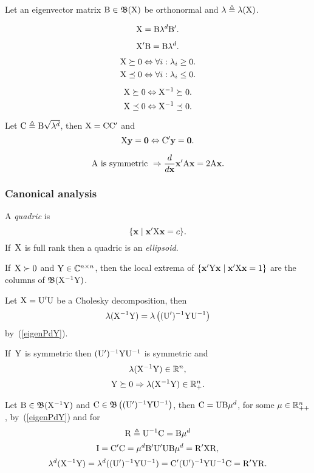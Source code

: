 \documentclass[10pt,a4paper]{article}
\theoremstyle{plain} \newtheorem{Lem}{Lemma}
\begin{document}
Let an eigenvector matrix $\mathrm B \in \mathfrak B (\mathrm X)$ be orthonormal and $\mathbf \lambda \triangleq \mathbf \lambda (\mathrm X)$.

$$  \mathrm X = \mathrm B \mathbf \lambda^d \mathrm B'. $$

$$ \mathrm X' \mathrm B = \mathrm B \mathbf \lambda^d. $$

$$ \mathrm X \succeq 0 \Leftrightarrow \forall i : \lambda_i \ge 0. $$
$$ \mathrm X \preceq 0 \Leftrightarrow \forall i : \lambda_i \le 0. $$

$$ \mathrm X \succeq 0 \Leftrightarrow \mathrm X^{-1} \succeq 0. $$
$$ \mathrm X \preceq 0 \Leftrightarrow \mathrm X^{-1} \preceq 0. $$

Let $\mathrm C \triangleq \mathrm B \sqrt{\mathbf \lambda^d}$,
then $\mathrm X = \mathrm C \mathrm C'$
and
\begin{equation*}
\mathrm X \mathbf y = \mathbf 0 \Leftrightarrow \mathrm C' \mathbf y = \mathbf 0.
\end{equation*}

$$ \mathrm A \text{ is symmetric } \Rightarrow \frac d {d \mathbf x} \mathbf x' \mathrm A \mathbf x = 2 \mathrm A \mathbf x. $$


\subsubsection{Canonical analysis}  \label{CanonicalAnalysis}
A {\em quadric} is
$$ \{\mathbf x \mid \mathbf x' \mathrm X \mathbf x = c\}. $$
If~$\mathrm X$ is full rank then a quadric is an {\em ellipsoid}.

If~$\mathrm X \succ 0$ and $\mathrm Y \in \mathbb C^{n \times n}$,
then the local extrema of $\{\mathbf x' \mathrm Y \mathbf x \mid \mathbf x' \mathrm X \mathbf x = 1\}$
are the columns of $\mathfrak B(\mathrm X^{-1} \mathrm Y)$.

Let $\mathrm X = \mathrm U' \mathrm U$ be a Cholesky decomposition,
then
$$\mathbf \lambda(\mathrm X^{-1} \mathrm Y) = \mathbf \lambda \left((\mathrm U')^{-1} \mathrm Y \mathrm U^{-1} \right)$$
by~(\ref{eigenPdY}).

\bigskip
If~$\mathrm Y$ is symmetric then $(\mathrm U')^{-1} \mathrm Y \mathrm U^{-1}$ is symmetric
and
$$\mathbf \lambda(\mathrm X^{-1} \mathrm Y) \in \mathbb R^n,$$
$$\mathrm Y \succeq 0 \Rightarrow \mathbf \lambda(\mathrm X^{-1} \mathrm Y) \in \mathbb R_+^n.$$

Let  $\mathrm B \in \mathfrak B(\mathrm X^{-1} \mathrm Y)$ and $\mathrm C \in \mathfrak B \left((\mathrm U')^{-1} \mathrm Y \mathrm U^{-1} \right)$,
then $\mathrm C = \mathrm U \mathrm B \mathbf \mu^d$, for some $\mathbf \mu \in \mathbb R_{++}^n$, by~(\ref{eigenPdY}) and
for $$ \mathrm R \triangleq \mathrm U^{-1} \mathrm C = \mathrm B \mathbf \mu^d$$
\begin{equation} \label{canonicalWithin}
  \mathrm I = \mathrm C' \mathrm C = \mathbf \mu^d \mathrm B' \mathrm U' \mathrm U \mathrm B \mathbf \mu^d = \mathrm R' \mathrm X \mathrm R,
\end{equation}
\begin{equation} \label{canonicalBetween}
 \mathbf \lambda^d(\mathrm X^{-1} \mathrm Y) = \mathbf \lambda^d((\mathrm U')^{-1} \mathrm Y \mathrm U^{-1}) = \mathrm C' (\mathrm U')^{-1} \mathrm Y \mathrm U^{-1} \mathrm C
  = \mathrm R' \mathrm Y \mathrm R.
\end{equation}
\end{document}
